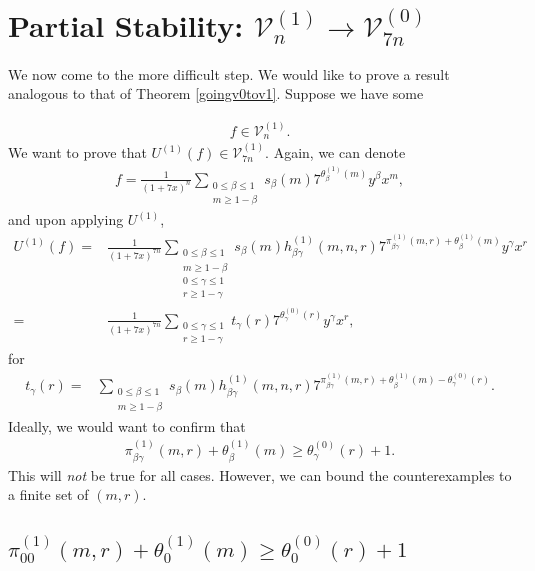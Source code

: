\documentclass[reqno]{amsart}
\theoremstyle{definition}
\theoremstyle{remark}
\numberwithin{equation}{section}
\begin{document}
\section{Partial Stability: $\mathcal{V}^{(1)}_n\rightarrow\mathcal{V}^{(0)}_{7n}$}\label{section1to0part}

We now come to the more difficult step.  We would like to prove a result analogous to that of Theorem \ref{goingv0tov1}.  Suppose we have some

\begin{align*}
f\in\mathcal{V}^{(1)}_n.
\end{align*}  We want to prove that $U^{(1)}(f)\in\mathcal{V}^{(1)}_{7n}$.  Again, we can denote
\begin{align*}
f=\frac{1}{(1+7x)^n}\sum_{\substack{0\le\beta\le 1\\ m\ge 1-\beta}}s_{\beta}(m)7^{\theta^{(1)}_{\beta}(m)}y^{\beta}x^m,
\end{align*} and upon applying $U^{(1)}$,
\begin{align*}
U^{(1)}\left( f \right) =& \frac{1}{(1+7x)^{7n}}\sum_{\substack{0\le\beta\le 1\\ m\ge 1-\beta\\ 0\le\gamma\le 1\\ r\ge 1-\gamma}} s_{\beta}(m)h^{(1)}_{\beta\gamma}(m,n,r) 7^{\pi^{(1)}_{\beta\gamma}(m,r)+\theta^{(1)}_{\beta}(m)}y^{\gamma}x^r\\
=& \frac{1}{(1+7x)^{7n}}\sum_{\substack{0\le\gamma\le 1\\ r\ge 1-\gamma}} t_{\gamma}(r) 7^{\theta^{(0)}_{\gamma}(r)}y^{\gamma}x^r,
\end{align*} for
\begin{align}
t_{\gamma}(r) =& \sum_{\substack{0\le\beta\le 1\\ m\ge 1-\beta}} s_{\beta}(m)h^{(1)}_{\beta\gamma}(m,n,r) 7^{\pi^{(1)}_{\beta\gamma}(m,r)+\theta^{(1)}_{\beta}(m)-\theta^{(0)}_{\gamma}(r)}.\label{tgammadefn}
\end{align}  Ideally, we would want to confirm that
\begin{align*}
\pi^{(1)}_{\beta\gamma}(m,r)+\theta^{(1)}_{\beta}(m)\ge \theta^{(0)}_{\gamma}(r) + 1.
\end{align*}  This will \textit{not} be true for all cases.  However, we can bound the counterexamples to a finite set of $(m,r)$.

\subsection{$\displaystyle{\pi^{(1)}_{00}(m,r)+\theta^{(1)}_0(m)\ge \theta^{(0)}_0(r)+1}$}\label{100bounds}
\end{document}
